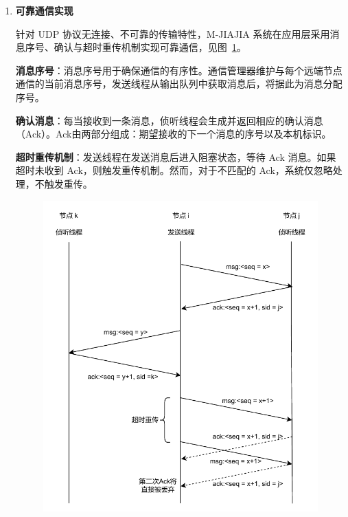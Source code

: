 {\begin{enumerate}[label=\arabic*.]
        \item \textbf{可靠通信实现}

              针对 UDP 协议无连接、不可靠的传输特性，M-JIAJIA 系统在应用层采用消息序号、确认与超时重传机制实现可靠通信，见图~\ref{fig:mjiajia-reliable-comm}。

              \textbf{消息序号}：消息序号用于确保通信的有序性。通信管理器维护与每个远端节点通信的当前消息序号，发送线程从输出队列中获取消息后，将据此为消息分配序号。

              \textbf{确认消息}：每当接收到一条消息，侦听线程会生成并返回相应的确认消息（Ack）。Ack由两部分组成：期望接收的下一个消息的序号以及本机标识。

              \textbf{超时重传机制}：发送线程在发送消息后进入阻塞状态，等待 Ack 消息。如果超时未收到 Ack，则触发重传机制。然而，对于不匹配的 Ack，系统仅忽略处理，不触发重传。
              \begin{figure}[H]
                  \centering
                  \includegraphics[width=1\textwidth]{Img/M-JIAJIA 可靠通信实现.drawio.pdf}
                  \label{fig:mjiajia-reliable-comm}
              \end{figure}


\end{enumerate}}
